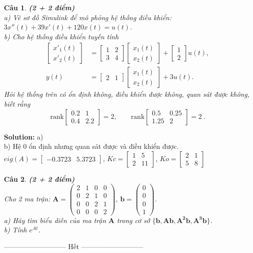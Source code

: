 \documentclass[11pt]{article}
\newtheorem{bt}{Câu}
\def\rank{\mathrm{rank}}
\newcommand{\m}[1]{
	\begin{bmatrix}
		#1
	\end{bmatrix}
}
\begin{document}
\begin{bt}\label{Câu 3}\textbf{(2 + 2 điểm)} \\ 
	a) Vẽ sơ đồ Simulink để mô phỏng hệ thống điều khiển: $ 3 x''(t) + 39 x'(t) + 120 x(t) = u(t)$.
	\\
	\noindent b) Cho hệ thống điều khiển tuyến tính
	\begin{align}
		\m{x'_1(t) \\ x'_2(t)} &= \m{1 & 2 \\ 3 & 4}  \m{x_1(t) \\ x_2(t)} + \m{1 \\ 2} u(t), \\
		y(t) &= \m{2 & 1} \m{x_1(t) \\ x_2(t)} + 3 u(t). 
	\end{align}
	Hỏi hệ thống trên có ổn định không, điều khiển được không, quan sát được không, biết rằng
	\[
	\rank \m{0.2 & 1\\0.4 & 2.2} = 2, \qquad 
	\rank \m{0.5 & 0.25 \\ 1.25 & 2} = 2 \ .\] 
\end{bt}
\begin{tcolorbox}[colback=red!5!white,colframe=green!75!black]
\textbf{Solution: } a) \\
b) Hệ 0 ổn định nhưng quan sát được và điều khiển được.
$ eig(A) = \m{-0.3723 & 5.3723}$, $Kc = \m{1 & 5 \\ 2 &  11}$, $Ko = \m{2 & 1 \\ 5 & 8}$
\end{tcolorbox}


\begin{bt}\label{Câu 4}\textbf{(2 + 2 điểm)} \\ 
	Cho 2 ma trận: $\mathbf{A} = \begin{pmatrix}
		2&1&0&0\\0&2&1&0\\0&0&2&1\\0&0&0&2
	\end{pmatrix}$, $\mathbf{b}=\begin{pmatrix}
		0\\0\\0\\1
	\end{pmatrix}$.
	\\
	\noindent a) Hãy tìm biểu diễn của ma trận $\mathbf{A}$ trong cơ sở $\{\mathbf{b}, \mathbf{Ab}, \mathbf{A^2b}, \mathbf{A^3b}\}$.
	\\
	\noindent b) Tính $e^{At}$.
\end{bt}
	
\begin{center}
	--------------------------- Hết ---------------------------
\end{center}
\end{document}
